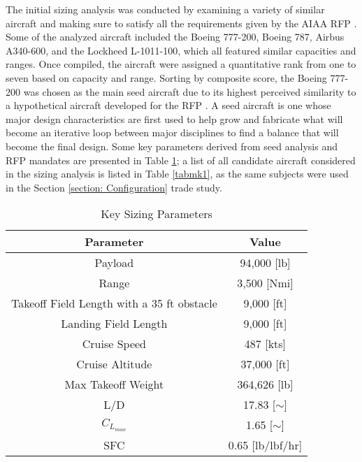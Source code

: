 The initial sizing analysis was conducted by examining a variety of similar aircraft and making sure to satisfy all the requirements given by the AIAA RFP \cite{RFP}. Some of the analyzed aircraft included the Boeing 777-200, Boeing 787, Airbus A340-600, and the Lockheed L-1011-100, which all featured similar capacities and ranges. Once compiled, the aircraft were assigned a quantitative rank from one to seven based on  capacity and range. Sorting by composite score, the Boeing 777-200 was chosen as the main seed aircraft due to its highest perceived similarity to a hypothetical aircraft developed for the RFP \cite{RFP}. A seed aircraft is one whose major design characteristics are first used to help grow and fabricate what will become an iterative loop between major disciplines to find a balance that will become the final design.  Some key parameters derived from seed analysis and RFP mandates are presented in Table \ref{tab:req}; a list of all candidate aircraft considered in the sizing analysis is listed in Table \ref{tabmk1}, as the same subjects were used in the Section \ref{section: Configuration} trade study.

\begin{table}[h!] 
    \centering
    \caption{Key Sizing Parameters}
    \begin{tabular}{ |c||c| }\toprule
    \textbf{Parameter} & \textbf{Value} \\\hline\hline
    Payload & 94,000 [lb]  \\\hline
    Range & 3,500 [Nmi] \\\hline
    Takeoff Field Length with a 35 ft obstacle & 9,000 [ft]  \\\hline
    Landing Field Length & 9,000 [ft] \\\hline
    Cruise Speed & 487 [kts]\\\hline
    Cruise Altitude & 37,000 [ft] \\\hline
    Max Takeoff Weight & 364,626 [lb]\\\hline 
    L/D & 17.83 [$\sim$]\\\hline 
    $C_{L_{max}}$ & 1.65 [$\sim$]\\\hline 
    SFC & 0.65 [lb/lbf/hr]\\\hline 

    \end{tabular}\label{tab:req}
\end{table}

